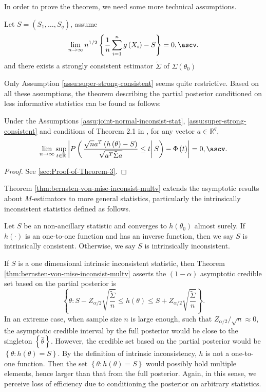 In order to prove the theorem, we need some more technical assumptions.
\begin{assumption}
\label{assu:super-strong-consistent}Let $S=\left(S_{1},\ldots,S_{q}\right)$,
assume 
\[
\lim_{n\rightarrow\infty}n^{1/2}\left\{ \frac{1}{n}\sum_{i=1}^{n}g\left(X_{i}\right)-S\right\} =0,\ascv.
\]
and there exists a strongly consistent estimator $\tilde{\Sigma}$
of $\Sigma\left(\theta_{0}\right)$
\end{assumption}
Only Assumption \ref{assu:super-strong-consistent} seems quite restrictive.
Based on all these assumptions, the theorem describing the partial
posterior conditioned on less informative statistics can be found
as follows:
\begin{thm}
\label{thm:bernsten-von-mise-inconsist-multv}Under the Assumptions
\ref{assu:joint-normal-inconsist-stat},
\ref{assu:super-strong-consistent} and conditions of Theorem 2.1
in \citet{rivoirard2012bernstein}, for any vector $a\in\mathbb{R}^{q}$,
\[
\lim_{n\rightarrow\infty}\sup_{t\in\mathbb{R}}\left|P\left(\left.\frac{\sqrt{n}a^{T}\left(h\left(\theta\right)-S\right)}{\sqrt{a^{T}\tilde{\Sigma}a}}\le t\right|S\right)-\Phi\left(t\right)\right|=0,\ascv.
\]
\end{thm}
\begin{proof}
See \ref{sec:Proof-of-Theorem-3}.
\end{proof}
Theorem \ref{thm:bernsten-von-mise-inconsist-multv} extends the asymptotic
results about $M$-estimators to more general statistics, particularly
the intrinsically inconsistent statistics defined as follows.
\begin{defn}
Let $S$ be an non-ancillary statistic and converges to $h\left(\theta_{0}\right)$
almost surely. If $h\left(\cdot\right)$ is an one-to-one function
and has an inverse function, then we say $S$ is intrinsically consistent.
Otherwise, we say $S$ is intrinsically inconsistent. 
\end{defn}
If $S$ is a one dimensional intrinsic inconsistent statistic, then
Theorem \ref{thm:bernsten-von-mise-inconsist-multv} asserts the $\left(1-\alpha\right)$
asymptotic credible set based on {{} } {the
} partial posterior is 
\[
\left\{ \theta:S-Z_{\alpha/2}\sqrt{\frac{\tilde{\Sigma}}{n}}\le h\left(\theta\right)\le S+Z_{\alpha/2}\sqrt{\frac{\tilde{\Sigma}}{n}}\right\} .
\]
In an extreme case, when sample size $n$ is large enough, such that
$Z_{\alpha/2}/\sqrt{n}\approx0$, the asymptotic credible interval
by {{} } {the } full posterior would be
close to the singleton $\left\{ \hat{\theta}\right\} $. However,
the credible set based on {{} } {the } partial
posterior would be $\left\{ \theta:h\left(\theta\right)=S\right\} $.
By the definition of intrinsic inconsistency, $h$ is not a one-to-one
function. Then the set $\left\{ \theta:h\left(\theta\right)=S\right\} $
would possibly hold multiple elements, hence larger than that from {{}
} {the } full posterior. Again, in this sense, we
perceive loss of efficiency due to conditioning the posterior on arbitrary
statistics. 

